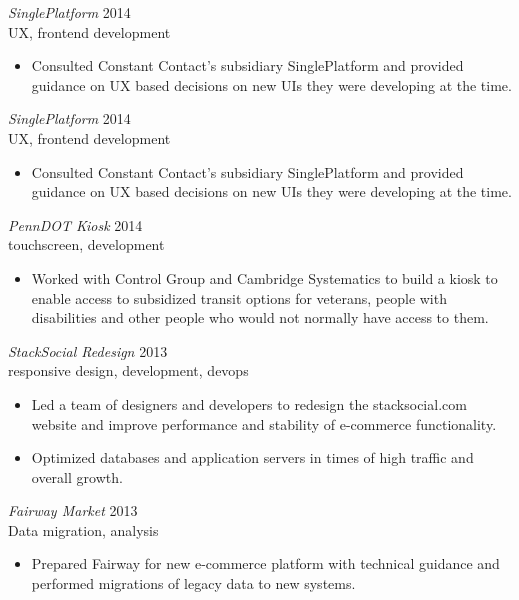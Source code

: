 \documentclass[line,margin]{res}
\begin{document}
\begin{resume}
    {\sl SinglePlatform}
    \hfill 2014 \\
    UX, frontend development
    \begin{itemize} \itemsep -2pt
        \item
            Consulted Constant Contact's subsidiary SinglePlatform and provided guidance
            on UX based decisions on new UIs they were developing at the time.
    \end{itemize}

    {\sl SinglePlatform}
    \hfill 2014 \\
    UX, frontend development
    \begin{itemize} \itemsep -2pt
        \item
            Consulted Constant Contact's subsidiary SinglePlatform and provided guidance
            on UX based decisions on new UIs they were developing at the time.
    \end{itemize}

    {\sl PennDOT Kiosk}
    \hfill 2014 \\
    touchscreen, development
    \begin{itemize} \itemsep -2pt
        \item
            Worked with Control Group and Cambridge Systematics to build a kiosk to
            enable access to subsidized transit options for veterans, people with 
            disabilities and other people who would not normally have access to them.
    \end{itemize}

    {\sl StackSocial Redesign}
    \hfill 2013 \\
    responsive design, development, devops
    \begin{itemize} \itemsep -2pt
        \item
            Led a team of designers and developers to redesign the stacksocial.com website 
            and improve performance and stability of e-commerce functionality.
        \item
            Optimized databases and application servers in times of high traffic and overall
            growth.
    \end{itemize}

    {\sl Fairway Market}
    \hfill 2013 \\
    Data migration, analysis
    \begin{itemize} \itemsep -2pt
        \item
            Prepared Fairway for new e-commerce platform with technical
            guidance and performed migrations of legacy data to new systems.


\end{itemize}
\end{resume}
\end{document}
